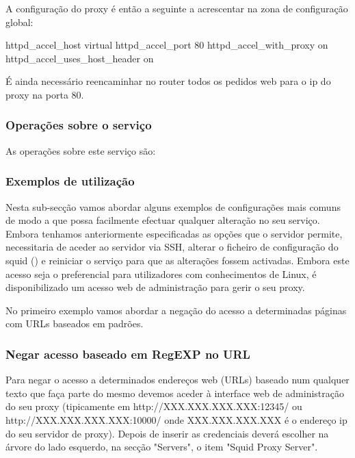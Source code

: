 A configuração do proxy é então a seguinte a acrescentar na
zona de configuração global:

\begin{Output}
httpd_accel_host virtual
httpd_accel_port 80
httpd_accel_with_proxy on
httpd_accel_uses_host_header on
\end{Output}

É ainda necessário reencaminhar no router todos os pedidos web para
o ip do proxy na porta 80.

\subsubsection{Operações sobre o serviço}

As operações sobre este serviço são:


\subsubsection{Exemplos de utilização}

Nesta sub-secção vamos abordar alguns exemplos de configurações mais comuns de modo a que possa facilmente efectuar qualquer alteração no seu serviço.
Embora tenhamos anteriormente especificadas as opções que o servidor permite, necessitaria de aceder ao servidor via SSH, alterar o ficheiro de configuração do squid () e reiniciar o serviço para que as alterações fossem activadas. Embora este acesso seja o preferencial para utilizadores com conhecimentos de Linux, é disponibilizado um acesso web de administração para gerir o seu proxy.

No primeiro exemplo vamos abordar a negação do acesso a determinadas páginas com URLs baseados em padrões.

\subsubsection{Negar acesso baseado em RegEXP no URL}

Para negar o acesso a determinados endereços web (URLs) baseado num qualquer texto que faça parte do mesmo devemos aceder à interface web de administração do seu proxy (tipicamente em http://XXX.XXX.XXX.XXX:12345/ ou http://XXX.XXX.XXX.XXX:10000/ onde XXX.XXX.XXX.XXX é o endereço ip do seu servidor de proxy). Depois de inserir as credenciais deverá escolher na árvore do lado esquerdo, na secção "Servers", o item "Squid Proxy Server".

